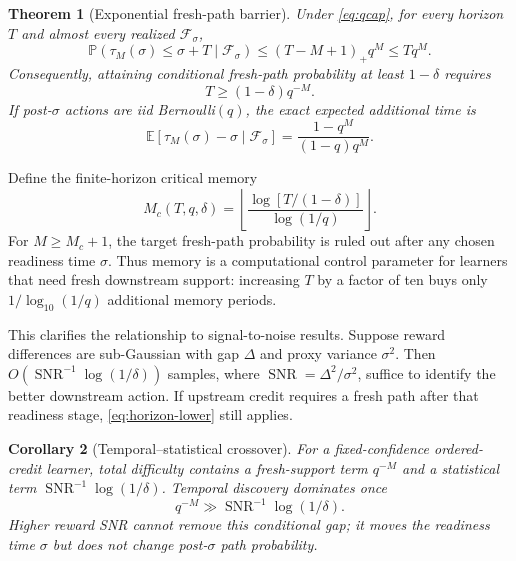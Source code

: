 \documentclass[10pt,twocolumn]{article}
\newtheorem{theorem}{Theorem}
\newtheorem{corollary}[theorem]{Corollary}
\newcommand{\E}{\mathbb{E}}
\newcommand{\Prb}{\mathbb{P}}
\newcommand{\SNR}{\operatorname{SNR}}
\begin{document}
\begin{theorem}[Exponential fresh-path barrier]
Under \cref{eq:qcap}, for every horizon $T$ and almost every realized
$\mathcal F_\sigma$,
\begin{equation}
 \Prb(\tau_M(\sigma)\le\sigma+T\mid\mathcal F_\sigma)
 \le (T-M+1)_+q^M\le Tq^M.
 \label{eq:discovery-bound}
\end{equation}
Consequently, attaining conditional fresh-path probability at least
$1-\delta$ requires
\begin{equation}
 T\ge (1-\delta)q^{-M}.
 \label{eq:horizon-lower}
\end{equation}
If post-$\sigma$ actions are iid Bernoulli$(q)$, the exact expected additional
time is
\begin{equation}
 \E[\tau_M(\sigma)-\sigma\mid\mathcal F_\sigma]
 =\frac{1-q^M}{(1-q)q^M}.
 \label{eq:exact-wait}
\end{equation}
\label{thm:critical}
\end{theorem}

Define the finite-horizon critical memory
\begin{equation}
 M_c(T,q,\delta)=
 \left\lfloor\frac{\log[T/(1-\delta)]}{\log(1/q)}\right\rfloor.
 \label{eq:critical-memory}
\end{equation}
For $M\ge M_c+1$, the target fresh-path probability is ruled out after any
chosen readiness time $\sigma$.  Thus memory is a computational control
parameter for learners that need fresh downstream support: increasing $T$ by a
factor of ten buys only $1/\log_{10}(1/q)$ additional memory periods.

This clarifies the relationship to signal-to-noise results.  Suppose
reward differences are sub-Gaussian with gap $\Delta$ and proxy variance
$\sigma^2$.  Then $O(\SNR^{-1}\log(1/\delta))$ samples, where
$\SNR=\Delta^2/\sigma^2$, suffice to identify the better downstream action.
If upstream credit requires a fresh path after that readiness stage,
\cref{eq:horizon-lower} still applies.

\begin{corollary}[Temporal--statistical crossover]
For a fixed-confidence ordered-credit learner, total difficulty contains a
fresh-support term $q^{-M}$ and a statistical term
$\SNR^{-1}\log(1/\delta)$.  Temporal discovery dominates once
\begin{equation}
 q^{-M}\gg \SNR^{-1}\log(1/\delta).
\end{equation}
Higher reward SNR cannot remove this conditional gap; it moves the readiness
time $\sigma$ but does not change post-$\sigma$ path probability.
\label{cor:snr}
\end{corollary}
\end{document}
